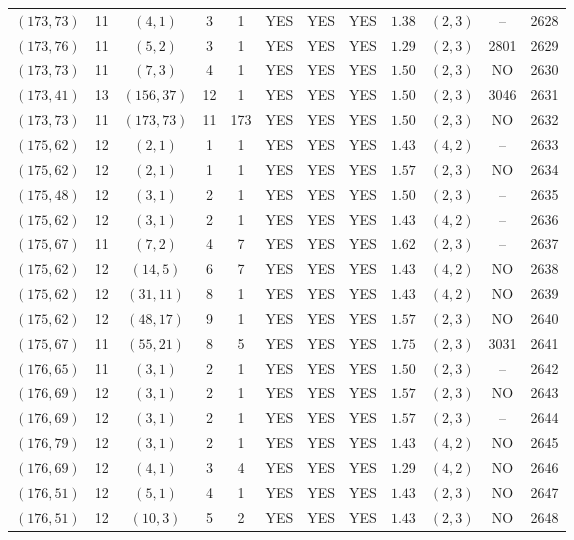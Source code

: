 \begin{longtable}{|c|c|c|c|c|c|c|c|c|c|c|c|}
$(173,73)$ & 11 & $(4,1)$ & 3 & 1 & YES & YES & YES & $1.38$ & $(2,3)$ & -- & 2628\\
$(173,76)$ & 11 & $(5,2)$ & 3 & 1 & YES & YES & YES & $1.29$ & $(2,3)$ & 2801 & 2629\\
$(173,73)$ & 11 & $(7,3)$ & 4 & 1 & YES & YES & YES & $1.50$ & $(2,3)$ & NO & 2630\\
$(173,41)$ & 13 & $(156,37)$ & 12 & 1 & YES & YES & YES & $1.50$ & $(2,3)$ & 3046 & 2631\\
$(173,73)$ & 11 & $(173,73)$ & 11 & 173 & YES & YES & YES & $1.50$ & $(2,3)$ & NO & 2632\\
$(175,62)$ & 12 & $(2,1)$ & 1 & 1 & YES & YES & YES & $1.43$ & $(4,2)$ & -- & 2633\\
$(175,62)$ & 12 & $(2,1)$ & 1 & 1 & YES & YES & YES & $1.57$ & $(2,3)$ & NO & 2634\\
$(175,48)$ & 12 & $(3,1)$ & 2 & 1 & YES & YES & YES & $1.50$ & $(2,3)$ & -- & 2635\\
$(175,62)$ & 12 & $(3,1)$ & 2 & 1 & YES & YES & YES & $1.43$ & $(4,2)$ & -- & 2636\\
$(175,67)$ & 11 & $(7,2)$ & 4 & 7 & YES & YES & YES & $1.62$ & $(2,3)$ & -- & 2637\\
$(175,62)$ & 12 & $(14,5)$ & 6 & 7 & YES & YES & YES & $1.43$ & $(4,2)$ & NO & 2638\\
$(175,62)$ & 12 & $(31,11)$ & 8 & 1 & YES & YES & YES & $1.43$ & $(4,2)$ & NO & 2639\\
$(175,62)$ & 12 & $(48,17)$ & 9 & 1 & YES & YES & YES & $1.57$ & $(2,3)$ & NO & 2640\\
$(175,67)$ & 11 & $(55,21)$ & 8 & 5 & YES & YES & YES & $1.75$ & $(2,3)$ & 3031 & 2641\\
$(176,65)$ & 11 & $(3,1)$ & 2 & 1 & YES & YES & YES & $1.50$ & $(2,3)$ & -- & 2642\\
$(176,69)$ & 12 & $(3,1)$ & 2 & 1 & YES & YES & YES & $1.57$ & $(2,3)$ & NO & 2643\\
$(176,69)$ & 12 & $(3,1)$ & 2 & 1 & YES & YES & YES & $1.57$ & $(2,3)$ & -- & 2644\\
$(176,79)$ & 12 & $(3,1)$ & 2 & 1 & YES & YES & YES & $1.43$ & $(4,2)$ & NO & 2645\\
$(176,69)$ & 12 & $(4,1)$ & 3 & 4 & YES & YES & YES & $1.29$ & $(4,2)$ & NO & 2646\\
$(176,51)$ & 12 & $(5,1)$ & 4 & 1 & YES & YES & YES & $1.43$ & $(2,3)$ & NO & 2647\\
$(176,51)$ & 12 & $(10,3)$ & 5 & 2 & YES & YES & YES & $1.43$ & $(2,3)$ & NO & 2648\\

\end{longtable}
